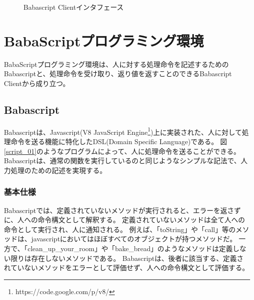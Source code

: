 \documentclass[twoside]{wiss}
\begin{document}
\begin{figure}[!h]  
  \centering
  \caption{Babascript Clientインタフェース}
  \label{webapp-interface}
\end{figure}

\section{BabaScriptプログラミング環境}
BabaScriptプログラミング環境は、人に対する処理命令を記述するためのBabascriptと、処理命令を受け取り、返り値を返すことのできるBabascript Clientから成り立つ。  

\subsection{Babascript}

Babascriptは、Javascript(V8 JavaScript Engine\footnote{https://code.google.com/p/v8/})上に実装された、人に対して処理命令を送る機能に特化したDSL(Domain Specific Language)である。
図\ref{script_01}のようなプログラムによって、人に処理命令を送ることができる。
Babascriptは、通常の関数を実行しているのと同じようなシンプルな記法で、人力処理のための記述を実現する。

\subsubsection{基本仕様}

Babascriptでは、定義されていないメソッドが実行されると、エラーを返さずに、人への命令構文として解釈する。
定義されていないメソッドは全て人への命令として実行され、人に通知される。
例えば、「toString」や「call」等のメソッドは、javascriptにおいてはほぼすべてのオブジェクトが持つメソッドだ。
一方で、「clean\_up\_your\_room」や「bake\_bread」のようなメソッドは定義しない限りは存在しないメソッドである。
Babascriptは、後者に該当する、定義されていないメソッドをエラーとして評価せず、人への命令構文として評価する。
\end{document}
